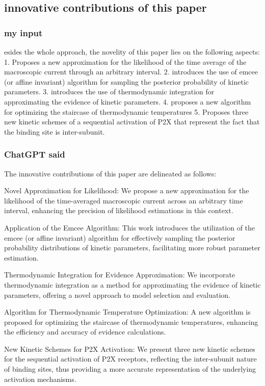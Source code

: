 \documentclass[pdflatex,sn-mathphys-num]{sn-jnl}%
\theoremstyle{thmstyleone}%
\theoremstyle{thmstyletwo}%
\theoremstyle{thmstylethree}%
\begin{document}
\subsection{innovative contributions of this paper}

\subsubsection{my input}
esides the whole approach, the novelity of this paper lies on the following aspects: 
1. Proposes a new approximation for the likelihood of the time average of the macroscopic current through an arbitrary interval. 
2. introduces the use of emcee (or affine invariant) algorithm for sampling the posterior probability of kinetic parameters. 
3. introduces the use of thermodynamic integration for approximating the evidence of kinetic parameters. 
4. proposes a new algorithm for optimizing the staircase of thermodynamic temperatures 
5. Proposes three new kinetic schemes of a sequential activation of P2X that represent the fact that the binding site is inter-subunit. 

\subsubsection {ChatGPT said}

The innovative contributions of this paper are delineated as follows:

Novel Approximation for Likelihood: We propose a new approximation for the likelihood of the time-averaged macroscopic current across an arbitrary time interval, enhancing the precision of likelihood estimations in this context.

Application of the Emcee Algorithm: This work introduces the utilization of the emcee (or affine invariant) algorithm for effectively sampling the posterior probability distributions of kinetic parameters, facilitating more robust parameter estimation.

Thermodynamic Integration for Evidence Approximation: We incorporate thermodynamic integration as a method for approximating the evidence of kinetic parameters, offering a novel approach to model selection and evaluation.

Algorithm for Thermodynamic Temperature Optimization: A new algorithm is proposed for optimizing the staircase of thermodynamic temperatures, enhancing the efficiency and accuracy of evidence calculations.

New Kinetic Schemes for P2X Activation: We present three new kinetic schemes for the sequential activation of P2X receptors, reflecting the inter-subunit nature of binding sites, thus providing a more accurate representation of the underlying activation mechanisms.
\end{document}
